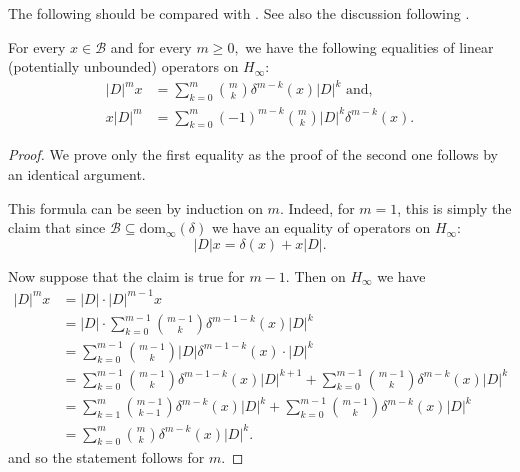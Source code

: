     The following should be compared with \cite[Lemma 6.2]{CPRS2}. See also the discussion following \cite[Lemma 10.22]{GVF}.
    \begin{lem}\label{left to right lemma}
        For every $x\in\mathcal{B}$ and for every $m\geq0,$ we have the following equalities
        of linear (potentially unbounded) operators on $H_\infty$:
        \begin{align*}
            |D|^mx &= \sum_{k=0}^m \binom{m}{k}\delta^{m-k}(x)|D|^k\text{ and, }\\
            x|D|^m &= \sum_{k=0}^m (-1)^{m-k}\binom{m}{k}|D|^k\delta^{m-k}(x).
        \end{align*}
    \end{lem}
    \begin{proof}
        We prove only the first equality as the proof of the second one follows by an identical argument.

        This formula can be seen by induction on $m.$ Indeed, for $m=1$, this is simply the claim
        that since $\mathcal{B} \subseteq \mathrm{dom}_\infty(\delta)$ we have an equality of operators on $H_\infty$:
        \begin{equation*}
            |D|x = \delta(x)+x|D|.
        \end{equation*}
        
        Now suppose that the claim is true for $m-1$. Then on $H_\infty$ we have
        \begin{align*}
            |D|^mx &= |D|\cdot|D|^{m-1}x \\
                   &= |D|\cdot\sum_{k=0}^{m-1}\binom{m-1}{k}\delta^{m-1-k}(x)|D|^k\\
                   &= \sum_{k=0}^{m-1}\binom{m-1}{k}|D|\delta^{m-1-k}(x)\cdot|D|^k\\
                   &= \sum_{k=0}^{m-1}\binom{m-1}{k}\delta^{m-1-k}(x)|D|^{k+1}+\sum_{k=0}^{m-1}\binom{m-1}{k}\delta^{m-k}(x)|D|^k\\
                   &= \sum_{k=1}^m\binom{m-1}{k-1}\delta^{m-k}(x)|D|^k+\sum_{k=0}^{m-1}\binom{m-1}{k}\delta^{m-k}(x)|D|^k\\
                   &= \sum_{k=0}^m\binom{m}{k}\delta^{m-k}(x)|D|^k.
        \end{align*} 
        and so the statement follows for $m$.
    \end{proof}

